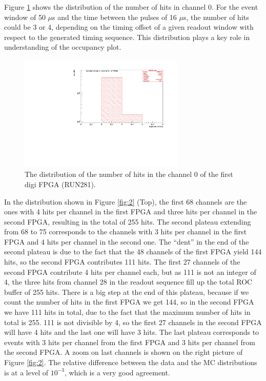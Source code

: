Figure \ref{fig:66} shows the distribution of the number of hits in channel 0.
For the event window of 50 $\mu$s and the time between the pulses of 16 $\mu$s,
the number of hits could be 3 or 4,
depending on the timing offset of a given readout window with respect to the generated timing sequence.
This distribution plays a key role in understanding of the occupancy plot.
\begin{figure}[!h]
\centering
\includegraphics[width =0.7\textwidth]{figures/pdf/figure_00066_nhits_ch00_run281.pdf}
\caption{
  The distribution of the number of hits in the channel 0 of the first digi FPGA (RUN281).
}
\label{fig:66}
\end{figure}

In the distribution shown in Figure \ref{fig:2} (Top),
the first 68 channels are the ones with 4 hits per channel in the first FPGA
and three hits per channel in the second FPGA, 
resulting in the total of 255 hits.
The second plateau extending from 68 to 75 corresponds to the channels
with 3 hits per channel in the first FPGA and 4 hits per channel in the second one.
  The ``dent'' in the end of the second plateau is due to the fact that the 48 channels of the first FPGA
  yield 144 hits, so the second FPGA contributes 111 hits. The first 27 channels of the second FPGA contribute
  4 hits per channel each, but as 111 is not an integer of 4, the three hits from channel 28 in the readout sequence
  fill up the total ROC buffer of 255 hits.
There is a big step at the end of this plateau, because if we count the number of hits
in the first FPGA we get 144, so in the second FPGA we have 111 hits in total,
due to the fact that the maximum number of hits in total is 255.
111 is not divisible by 4, so the first 27 channels in the second FPGA will have 4 hits
and the last one will have 3 hits.
The last plateau corresponds to events with 3 hits per channel from the first FPGA
and 3 hits per channel from the second FPGA.
A zoom on last channels is shown on the right picture of Figure \ref{fig:2}.
The relative difference between the data and the MC distributions is at a level of $10^{-3}$,
which is a very good agreement.

